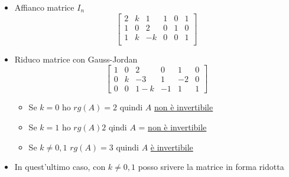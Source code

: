 \documentclass[12pt,a4paper,oneside]{article}
\begin{document}
\begin{itemize}
	\item Affianco matrice $I_n$
	      \[
		      \begin{bmatrix}
			      2 & k & 1  & 1 & 0 & 1 \\
			      1 & 0 & 2  & 0 & 1 & 0 \\
			      1 & k & -k & 0 & 0 & 1 \\
		      \end{bmatrix}
	      \]
	\item Riduco matrice con Gauss-Jordan
	      \[
		      \begin{bmatrix}
			      1 & 0 & 2   & 0  & 1  & 0 \\
			      0 & k & -3  & 1  & -2 & 0 \\
			      0 & 0 & 1-k & -1 & 1  & 1
		      \end{bmatrix}
	      \]
	      \begin{itemize}
		      \item Se $k=0$ ho $rg\left( A \right) =2$ quindi $A$ \underline{non è invertibile}
		      \item Se $k=1$ ho $rg\left( A \right) 2$ qindi $A$ = \underline{non è invertibile}
		      \item Se $k \neq 0,1$ $rg\left( A \right) =3$ quindi $A$ \underline{è invertibile}
	      \end{itemize}
	\item In quest'ultimo caso, con $k \neq 0,1$ posso srivere la matrice in forma ridotta
\end{itemize}
\end{document}
